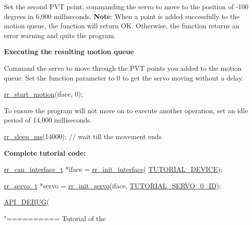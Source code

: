 \begin{DoxyEnumerate}
\item Set the second P\+VT point, commanding the servo to move to the position of -\/100 degrees in 6,000 milliseconds. {\bfseries Note}\+: When a point is added successfully to the motion queue, the function will return OK. Otherwise, the function returns an error warning and quits the program. 
 {\bfseries  Executing the resulting motion queue }
\item Command the servo to move through the P\+VT points you added to the motion queue. Set the function parameter to 0 to get the servo moving without a delay. 
\begin{DoxyCodeInclude}
    \hyperlink{group___trajectory_gaeb3f167be0e7caf96d4cb4b648d3a548}{rr\_start\_motion}(iface, 0);
\end{DoxyCodeInclude}

\item To ensure the program will not move on to execute another operation, set an idle period of 14,000 milliseconds. 
\begin{DoxyCodeInclude}
    \hyperlink{group___aux_gaeb26028b83635e028ebc901e1cbf33a1}{rr\_sleep\_ms}(14000); \textcolor{comment}{// wait till the movement ends}
\end{DoxyCodeInclude}
 {\bfseries  Complete tutorial code\+: } 
\begin{DoxyCodeInclude}
    \hyperlink{structrr__can__interface__t}{rr\_can\_interface\_t} *iface = \hyperlink{group___init_ga472a4890dcc7d7a13123c56a06946d91}{rr\_init\_interface}(
      \hyperlink{tutorial_8h_a90947332a0345dc693905e3fc04dbeb2}{TUTORIAL\_DEVICE});
    
    \hyperlink{structrr__servo__t}{rr\_servo\_t} *servo = \hyperlink{group___init_ga0adb313a3eeb8a4399431e940a1f3e9e}{rr\_init\_servo}(iface, 
      \hyperlink{tutorial_8h_a9a3d33f25d3a72a8e30c885d238b3b65}{TUTORIAL\_SERVO\_0\_ID});

    \hyperlink{api_8h_a0e4aafa2ca9bd25219713176906b7c40}{API\_DEBUG}(\textcolor{stringliteral}{"========== Tutorial of the %

}
\end{DoxyCodeInclude}
\end{DoxyEnumerate}
